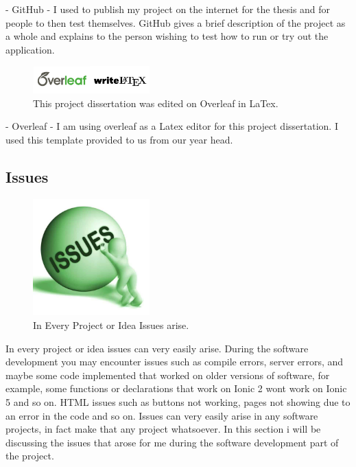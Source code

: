- GitHub - I used to publish my project on the internet for the thesis and for people to then test themselves. GitHub gives a brief description of the project as a whole and explains to the person wishing to test how to run or try out the application. 
\newline

\begin{figure}[h!]
	\caption{This project dissertation was edited on Overleaf in LaTex.}
	\label{image:overleaf-latex}
	\centering
	\includegraphics[width=0.4\textwidth]{images/overleaf-latex.png}
\end{figure}

- Overleaf - I am using overleaf as a Latex editor for this project dissertation. I used this template provided to us from our year head.

\subsection{Issues}

\begin{figure}[h!]
	\caption{In Every Project or Idea Issues arise.}
	\label{image:issues}
	\centering
	\includegraphics[width=0.4\textwidth]{images/issues.jpg}
\end{figure}

In every project or idea issues can very easily arise. During the software development you may encounter issues such as compile errors, server errors, and maybe some code implemented that worked on older versions of software, for example, some functions or declarations that work on Ionic 2 wont work on Ionic 5 and so on. HTML issues such as buttons not working, pages not showing due to an error in the code and so on. Issues can very easily arise in any software projects, in fact make that any project whatsoever. In this section i will be discussing the issues that arose for me during the software development part of the project. 
\newline

